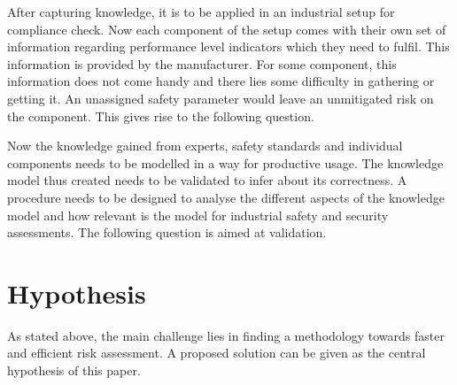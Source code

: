 
After capturing knowledge, it is to be applied in an industrial setup for compliance check. Now each component of the setup comes with their own set of information regarding performance level indicators which they need to fulfil. This information is provided by the manufacturer. For some component, this information does not come handy and there lies some difficulty in gathering or getting it. An unassigned safety parameter would leave an unmitigated risk on the component. This gives rise to the following question.


Now the knowledge gained from experts, safety standards and individual components needs to be modelled in a way for productive usage. The knowledge model thus created needs to be validated  to infer about its correctness. A procedure needs to be designed to analyse the different aspects of the knowledge model and how relevant is the model for industrial safety and security assessments. The following question is aimed at validation.


\section{Hypothesis} \label{hyp}

As stated above, the main challenge lies in finding a methodology towards faster and efficient risk assessment. A proposed solution can be given as the central hypothesis of this paper.



